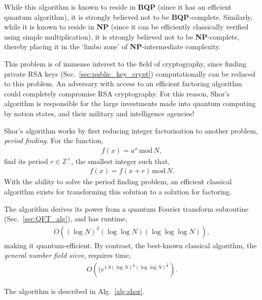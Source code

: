  While this algorithm is known to reside in \textbf{BQP} (since it has an efficient quantum algorithm), it is strongly believed not to be \textbf{BQP}-complete. Similarly, while it is known to reside in \textbf{NP} (since it can be efficiently classically verified using simple multiplication), it is strongly believed not to be \textbf{NP}-complete, thereby placing it in the `limbo zone' of \textbf{NP}-intermediate complexity.

This problem is of immense interest to the field of cryptography, since finding private RSA keys (Sec.~\ref{sec:public_key_crypt}) computationally can be reduced to this problem. An adversary with access to an efficient factoring algorithm could completely compromise RSA cryptography. For this reason, Shor's algorithm is responsible for the large investments made into quantum computing by nation states, and their military and intelligence agencies!

Shor's algorithm works by first reducing integer factorisation to another problem, \textit{period finding}. For the function,
\begin{align}
f(x)= a^x \,\mathrm{mod}\, N,	
\end{align}
find its period \mbox{$r\in\mathbb{Z}^+$}, the smallest integer such that,
\begin{align}
f(x)=f(x+r) \,\mathrm{mod}\, N.	
\end{align}
With the ability to solve the period finding problem, an efficient classical algorithm exists for transforming this solution to a solution for factoring.

The algorithm derives its power from a quantum Fourier transform subroutine (Sec.~\ref{sec:QFT_alg}), and has runtime,
\begin{align}
O((\log N)^2(\log\log N)(\log\log\log N)),	
\end{align}
making it quantum-efficient. By contrast, the best-known classical algorithm, the \textit{general number field sieve}, requires time,
\begin{align}
	O\left((e^{1.9(\log N)^{\frac{1}{3}}(\log\log N)^\frac{2}{3}}\right).
\end{align}

The algorithm is described in Alg.~\ref{alg:shor}.

